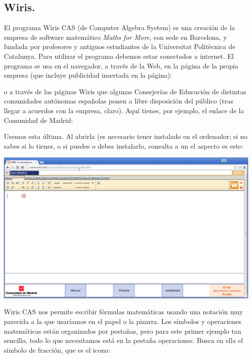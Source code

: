 \documentclass[10pt,a4paper]{article}\usepackage[]{graphicx}\usepackage[]{color}
\begin{document}
\subsection{Wiris.}
\label{tut03:subsec:Wiris}

El programa Wiris CAS (de Computer Algebra System) es una creación de la empresa de software matemático {\em Maths for More}, con sede en Barcelona, y fundada por profesores y antiguos estudiantes de la Universitat Politècnica de Catalunya. Para utilizar el programa debemos estar conectados a internet.  El programa se usa en el navegador, a través de la Web, en la página de la propia empresa (que incluye publicidad insertada en la página):
\begin{center}
\end{center}
o a través de las páginas Wiris que algunas Consejerías de Educación de distintas comunidades autónomas españolas ponen a libre disposición del público (tras llegar a acuerdos con la empresa, claro). Aquí tienes, por ejemplo, el enlace de la Comunidad de Madrid:
\begin{center}
\end{center}
Usemos esta última. Al abrirla (es necesario tener instalado  en el ordenador; si no sabes si lo tienes, o si puedes o debes instalarlo, consulta a un  el aspecto es este:
    \begin{center}
    \includegraphics[width=15.5cm]{../fig/Tut04-09.png}
    \end{center}
Wiris CAS nos permite escribir fórmulas matemáticas usando una notación muy parecida a la que usaríamos en el papel o la pizarra. Los símbolos y operaciones matemáticas están organizados por pestañas, pero para este primer ejemplo tan sencillo, todo lo que necesitamos está en la pestaña operaciones. Busca en ella el símbolo de fracción, que es el icono:
\end{document}
